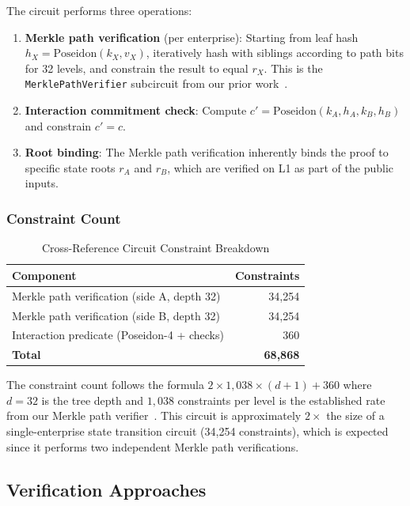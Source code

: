 The circuit performs three operations:

\begin{enumerate}
\item \textbf{Merkle path verification} (per enterprise): Starting from leaf
  hash $h_X = \text{Poseidon}(k_X, v_X)$, iteratively hash with siblings
  according to path bits for 32 levels, and constrain the result to equal $r_X$.
  This is the \texttt{MerklePathVerifier} subcircuit from our prior
  work~\cite{ruv1smt}.

\item \textbf{Interaction commitment check}: Compute
  $c' = \text{Poseidon}(k_A, h_A, k_B, h_B)$ and constrain $c' = c$.

\item \textbf{Root binding}: The Merkle path verification inherently binds
  the proof to specific state roots $r_A$ and $r_B$, which are verified on L1
  as part of the public inputs.
\end{enumerate}

\subsubsection{Constraint Count}

\begin{table}[htbp]
\centering
\caption{Cross-Reference Circuit Constraint Breakdown}
\label{tab:constraints}
\begin{tabular}{@{}lr@{}}
\toprule
Component & Constraints \\
\midrule
Merkle path verification (side A, depth 32) & 34,254 \\
Merkle path verification (side B, depth 32) & 34,254 \\
Interaction predicate (Poseidon-4 + checks) & 360 \\
\midrule
\textbf{Total} & \textbf{68,868} \\
\bottomrule
\end{tabular}
\end{table}

The constraint count follows the formula $2 \times 1{,}038 \times (d+1) + 360$
where $d = 32$ is the tree depth and $1{,}038$ constraints per level is the
established rate from our Merkle path verifier~\cite{ruv2circuit}. This
circuit is approximately $2\times$ the size of a single-enterprise state
transition circuit (34,254 constraints), which is expected since it performs
two independent Merkle path verifications.

\subsection{Verification Approaches}

